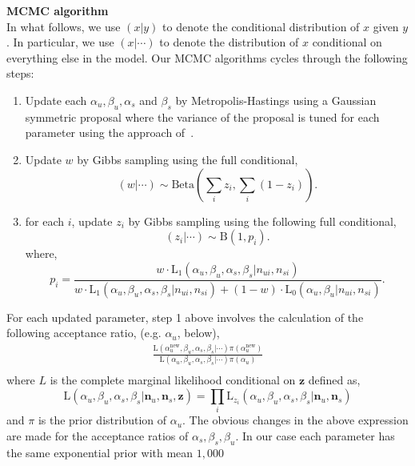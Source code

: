 \documentclass{article}
\begin{document}
\noindent\textbf{MCMC algorithm}\\
In what follows, we use $(x|y)$ to denote the conditional distribution of $x$ given $y$. In particular, we use $(x|\cdots)$ to denote the distribution of $x$ conditional on everything else in the model. Our MCMC algorithms cycles through the following steps:
\begin{enumerate}
\item Update each $\alpha_u, \beta_u, \alpha_s$ and $\beta_s$ by Metropolis-Hastings using a Gaussian symmetric proposal where the variance of the proposal is tuned for each parameter using the approach of~\cite{Gelman:2004tc}.
\item Update $w$ by Gibbs sampling using the full conditional,
\[
(w|\cdots)\sim \mathrm{Beta}(\sum_i z_i,\sum_i (1-z_i)).
\]
\item for each $i$, update $z_i$ by Gibbs sampling using the following full conditional,
\[
(z_i|\cdots)\sim\mathrm{B}(1,p_i).
\]
where,
\[
p_i=\frac{w\cdot\mathrm{L_1}(\alpha_u,\beta_u,\alpha_s,\beta_s| n_{ui},n_{si})}{w\cdot\mathrm{L_1}(\alpha_u,\beta_u,\alpha_s,\beta_s|n_{ui},n_{si})+(1-w)\cdot\mathrm{L_0}(\alpha_u,\beta_u|n_{ui},n_{si})}.
\]
\end{enumerate}
For each updated parameter, step 1 above involves the calculation of the following acceptance ratio, (e.g. $\alpha_u$, below),
\[
\begin{split}
\frac{\mathrm{L}(\alpha^{\text{new}}_u,\beta_u,\alpha_s,\beta_s|\cdots)\pi(\alpha^{\text{new}}_u)}{\mathrm{L}(\alpha_u,\beta_u,\alpha_s,\beta_s|\cdots)\pi(\alpha_u)}\\
\end{split}
\]
where $L$ is the complete marginal likelihood conditional on $\mathbf{z}$ defined as,
\[
\mathrm{L}(\alpha_u,\beta_u,\alpha_s,\beta_s|\mathbf{n}_u,\mathbf{n}_s,\mathbf{z})=\prod_i\mathrm{L}_{z_i}(\alpha_u,\beta_u,\alpha_s,\beta_s|\mathbf{n}_u,\mathbf{n}_s)
\]
and $\pi$ is the prior distribution of $\alpha_u$. The obvious changes in the above expression are made for the acceptance ratios of $\alpha_s,\beta_s,\beta_u$. In our case each parameter has the same exponential prior with mean $1,000$
\end{document}

